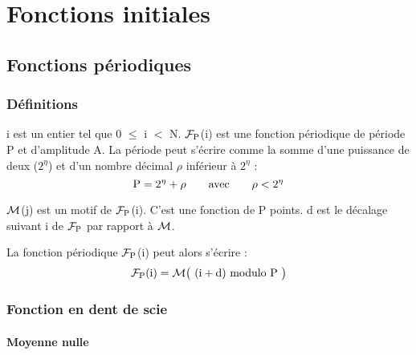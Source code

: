 
\chapter{Fonctions initiales}

\section{Fonctions périodiques}
\subsection{Définitions}
i est un entier tel que 0 $\leqslant$ i $<$ N. $\mathcal{F}_{\text{P}}$(i) est une fonction périodique de période P et d'amplitude A. La période peut s'écrire comme la somme d'une puissance de deux ($2^\eta$)
et d'un nombre décimal $\rho$ inférieur à $2^\eta$ :
\[
\text{P}=2^\eta+\rho\qquad\text{avec}\qquad\rho<2^\eta
\]

$\mathcal{M}$(j) est un motif de $\mathcal{F}_{\text{P}}$(i). C'est une fonction de P
points. d est le décalage suivant i de $\mathcal{F}_{\text{P}}$ par rapport à $\mathcal{M}$.

La fonction périodique $\mathcal{F}_{\text{P}}$(i) peut alors s'écrire :
\[
\mathcal{F}_{\text{P}}\text{(i)}=\mathcal{M}\big(\text{ (i}+\text{d) modulo P }\big)
\]

\subsection{Fonction en dent de scie}

\subsubsection{Moyenne nulle}


\begin{center}  \end{center}

